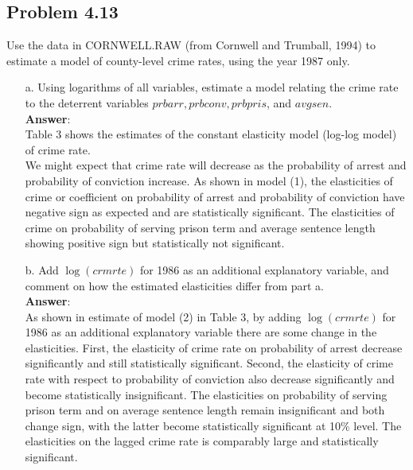 \documentclass[10pt]{article}
\begin{document}
\subsection*{Problem 4.13}
Use the data in CORNWELL.RAW (from Cornwell and Trumball, 1994) to estimate a model of county-level crime rates, using the year 1987 only.
\begin{enumerate}
\item[a.] Using logarithms of all variables, estimate a model relating the crime rate to the deterrent variables $prbarr, prbconv, prbpris$, and $avgsen.$
\\ \textbf{Answer}:\\
Table 3 shows the estimates of the constant elasticity model (log-log model) of crime rate. 
\\
We might expect that crime rate will decrease as the probability of arrest and probability of conviction increase. As shown in model (1), the elasticities of crime or coefficient on probability of arrest and probability of conviction have negative sign as expected and are statistically significant. The elasticities of crime on probability of serving prison term and average sentence length showing positive sign but statistically not significant.

\item[b.] Add $\log(crmrte)$ for 1986 as an additional explanatory variable, and comment on how the estimated elasticities differ from part a.
\\ \textbf{Answer}:\\
As shown in estimate of model (2) in Table 3, by adding $\log(crmrte)$ for 1986 as an additional explanatory variable there are some change in the elasticities. First, the elasticity of crime rate on probability of arrest decrease significantly and still statistically significant. Second, the elasticity of crime rate with respect to probability of conviction also decrease significantly and become statistically insignificant. The elasticities on probability of serving prison term and on average sentence length remain insignificant and both change sign, with the latter become statistically significant at 10\% level. The elasticities on the lagged crime rate is comparably large and statistically significant.


\end{enumerate}
\end{document}
